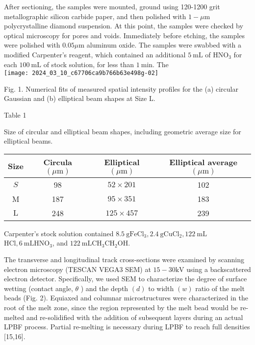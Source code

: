 \documentclass[10pt]{article}
\begin{document}
After sectioning, the samples were mounted, ground using 120-1200 grit metallographic silicon carbide paper, and then polished with $1-\mu \mathrm{m}$ polycrystalline diamond suspension. At this point, the samples were checked by optical microscopy for pores and voids. Immediately before etching, the samples were polished with $0.05 \mu \mathrm{m}$ aluminum oxide. The samples were swabbed with a modified Carpenter's reagent, which contained an additional $5 \mathrm{~mL}$ of $\mathrm{HNO}_{3}$ for each $100 \mathrm{~mL}$ of stock solution, for less than $1 \mathrm{~min}$. The\\
\texttt{[image: 2024\_03\_10\_c67706ca9b766b63e498g-02]}

Fig. 1. Numerical fits of measured spatial intensity profiles for the (a) circular Gaussian and (b) elliptical beam shapes at Size L.

Table 1

Size of circular and elliptical beam shapes, including geometric average size for elliptical beams.

\begin{center}
\begin{tabular}{|c|c|c|c|}
\hline
Size & Circula $(\mu \mathrm{m})$ & Elliptical $(\mu \mathrm{m})$ & Elliptical average $(\mu \mathrm{m})$ \\
\hline
$S$ & 98 & $52 \times 201$ & 102 \\
\hline
M & 187 & $95 \times 351$ & 183 \\
\hline
$\mathrm{L}$ & 248 & $125 \times 457$ & 239 \\
\hline
\end{tabular}
\end{center}

Carpenter's stock solution contained $8.5 \mathrm{~g} \mathrm{FeCl}_{3}, 2.4 \mathrm{~g} \mathrm{CuCl}_{2}, 122 \mathrm{~mL}$ $\mathrm{HCl}, 6 \mathrm{~mL} \mathrm{HNO}_{3}$, and $122 \mathrm{~mL} \mathrm{CH}_{3} \mathrm{CH}_{2} \mathrm{OH}$.

The transverse and longitudinal track cross-sections were examined by scanning electron microscopy (TESCAN VEGA3 SEM) at $15-30 \mathrm{kV}$ using a backscattered electron detector. Specifically, we used SEM to characterize the degree of surface wetting (contact angle, $\theta$ ) and the depth $(d)$ to width $(w)$ ratio of the melt beads (Fig. 2). Equiaxed and columnar microstructures were characterized in the root of the melt zone, since the region represented by the melt bead would be re-melted and re-solidified with the addition of subsequent layers during an actual LPBF process. Partial re-melting is necessary during LPBF to reach full densities [15,16].
\end{document}
